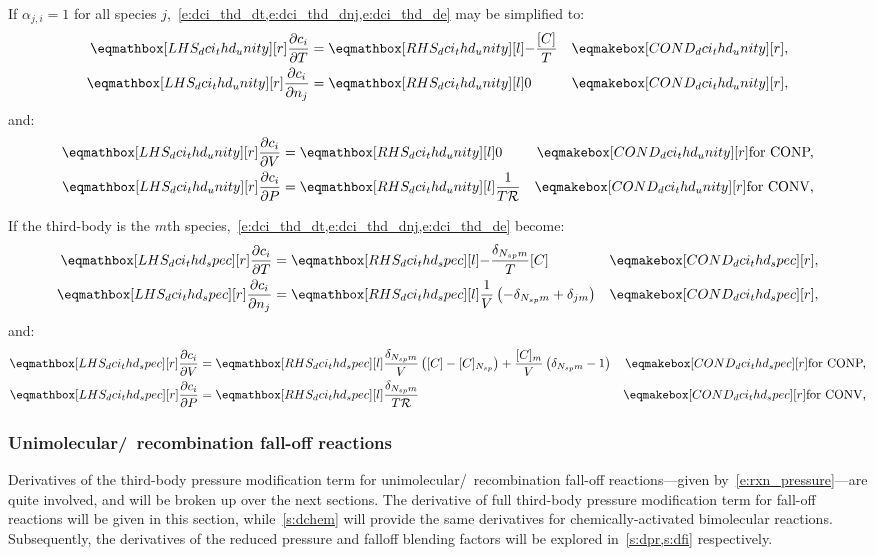 \documentclass[12pt]{article}
\newcommand{\ns}{N_{sp}}
\newcommand{\conp}{CONP}
\newcommand{\conv}{CONV}
\newcommand{\dconp}{\ifmmode\text{for \conp,}\else for \conp,\fi}
\newcommand{\dconv}{\ifmmode\text{for \conv,}\else for \conv,\fi}
\newcommand{\Ru}{\mathcal{R}}
\begin{document}
If $\alpha_{j,i} = 1$ for all species $j$,~\cref{e:dci_thd_dt,e:dci_thd_dnj,e:dci_thd_de} may be simplified to:
\begin{align}
 \lhs{dci_thd_unity}{\frac{\partial c_{i} }{\partial T }} &= \rhs{dci_thd_unity}{- \frac{[C]}{T}}& \cond{dci_thd_unity}{,} \label{e:dci_thd_unity_dt} \\
 \lhs{dci_thd_unity}{\frac{\partial c_{i} }{\partial n_{j} }} &= \rhs{dci_thd_unity}{0}& \cond{dci_thd_unity}{,}
\end{align}
and:
\begin{subequations}
 \label{e:dci_thd_unity_de}
 \begin{align}
  \lhs{dci_thd_unity}{\frac{\partial c_{i} }{\partial V }} &= \rhs{dci_thd_unity}{0} & \cond{dci_thd_unity}{\dconp} \\
  \lhs{dci_thd_unity}{\frac{\partial c_{i} }{\partial P }} &= \rhs{dci_thd_unity}{\frac{1}{T \Ru}}& \cond{dci_thd_unity}{\dconv}
 \end{align}
\end{subequations}

If the third-body is the $m$th species,~\cref{e:dci_thd_dt,e:dci_thd_dnj,e:dci_thd_de} become:
\begin{align}
 \lhs{dci_thd_spec}{\frac{\partial c_{i} }{\partial T }} &= \rhs{dci_thd_spec}{-\frac{\delta_{\ns m}}{T} [C]}&\cond{dci_thd_spec}{,} \label{e:dci_thd_spec_dt} \\
 \lhs{dci_thd_spec}{\frac{\partial c_{i} }{\partial n_j }} &= \rhs{dci_thd_spec}{\frac{1}{V} \left(- \delta_{\ns m} + \delta_{j m}\right)}&\cond{dci_thd_spec}{,} \label{e:dci_thd_spec_dnj} \\
\end{align}
and:
\begin{subequations}
\label{e:dci_thd_spec_de}
\begin{align}
\lhs{dci_thd_spec}{\frac{\partial c_{i} }{\partial V }} &= \rhs{dci_thd_spec}{\frac{\delta_{\ns m}}{V} \left([C] - [C]_{\ns}\right) + \frac{[C]_{m}}{V} \left(\delta_{\ns m} - 1\right)} & \cond{dci_thd_spec}{\dconp} \\
\lhs{dci_thd_spec}{\frac{\partial c_{i} }{\partial P }} &= \rhs{dci_thd_spec}{\frac{\delta_{\ns m}}{T \Ru}} & \cond{dci_thd_spec}{\dconv}
\end{align}
\end{subequations}

\subsubsection{Unimolecular\slash~recombination fall-off reactions}
\label{s:dfall}
Derivatives of the third-body pressure modification term for unimolecular\slash~recombination fall-off reactions---given by~\cref{e:rxn_pressure}---are quite involved, and will be broken up over the next sections.
The derivative of full third-body pressure modification term for fall-off reactions will be given in this section, while~\cref{s:dchem} will provide the same derivatives for chemically-activated bimolecular reactions.
Subsequently, the derivatives of the reduced pressure and falloff blending factors will be explored in~\cref{s:dpr,s:dfi} respectively.
\end{document}
